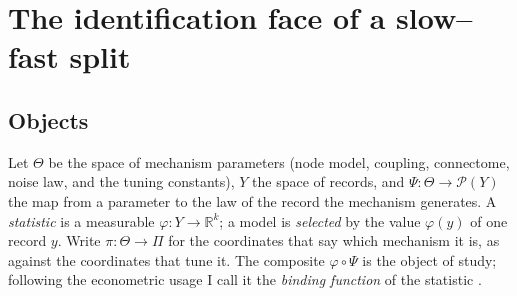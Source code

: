 \documentclass[10pt]{article}
\begin{document}
\section{The identification face of a slow--fast split}
\subsection{Objects}
Let $\Theta$ be the space of mechanism parameters (node model, coupling, connectome, noise law, and the tuning constants), $Y$ the space of records, and $\Psi:\Theta\to\mathcal{P}(Y)$ the map from a parameter to the law of the record the mechanism generates. A \emph{statistic} is a measurable $\varphi:Y\to\mathbb{R}^k$; a model is \emph{selected} by the value $\varphi(y)$ of one record $y$. Write $\pi:\Theta\to\Pi$ for the coordinates that say which mechanism it is, as against the coordinates that tune it. The composite $\varphi\circ\Psi$ is the object of study; following the econometric usage I call it the \emph{binding function} of the statistic \parencite{koopmans1950,rothenberg1971}.
\end{document}
